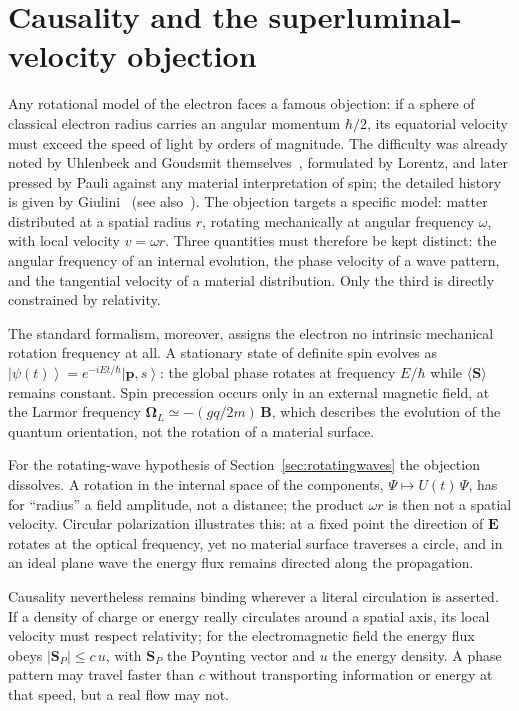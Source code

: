 \documentclass[11pt,a4paper]{article}
\newcommand{\ket}[1]{\left|#1\right\rangle}
\begin{document}
\section{Causality and the superluminal-velocity objection}
\label{sec:causality}

Any rotational model of the electron faces a famous objection: if a sphere of classical electron radius
carries an angular momentum $\hbar/2$, its equatorial velocity must exceed the speed of light by orders of
magnitude.
The difficulty was already noted by Uhlenbeck and Goudsmit themselves~\cite{Uhlenbeck1925}, formulated by
Lorentz, and later pressed by Pauli against any material interpretation of spin; the detailed history is
given by Giulini~\cite{Giulini2008} (see also~\cite{Tomonaga1997}).
The objection targets a specific model: matter distributed at a spatial radius $r$, rotating mechanically at
angular frequency $\omega$, with local velocity $v = \omega r$.
Three quantities must therefore be kept distinct: the angular frequency of an internal evolution, the phase
velocity of a wave pattern, and the tangential velocity of a material distribution.
Only the third is directly constrained by relativity.

The standard formalism, moreover, assigns the electron no intrinsic mechanical rotation frequency at all.
A stationary state of definite spin evolves as $\ket{\psi(t)} = e^{-iEt/\hbar} \ket{\mathbf{p}, s}$: the
global phase rotates at frequency $E/\hbar$ while $\langle \mathbf{S} \rangle$ remains constant.
Spin precession occurs only in an external magnetic field, at the Larmor frequency
$\boldsymbol{\Omega}_L \simeq -(gq/2m)\, \mathbf{B}$, which describes the evolution of the quantum
orientation, not the rotation of a material surface.

For the rotating-wave hypothesis of Section~\ref{sec:rotatingwaves} the objection dissolves.
A rotation in the internal space of the components, $\Psi \mapsto U(t)\, \Psi$, has for ``radius'' a field
amplitude, not a distance; the product $\omega r$ is then not a spatial velocity.
Circular polarization illustrates this: at a fixed point the direction of $\mathbf{E}$ rotates at the
optical frequency, yet no material surface traverses a circle, and in an ideal plane wave the energy flux
remains directed along the propagation.

Causality nevertheless remains binding wherever a literal circulation is asserted.
If a density of charge or energy really circulates around a spatial axis, its local velocity must respect
relativity; for the electromagnetic field the energy flux obeys $|\mathbf{S}_P| \le c\, u$, with
$\mathbf{S}_P$ the Poynting vector and $u$ the energy density.
A phase pattern may travel faster than $c$ without transporting information or energy at that speed, but a
real flow may not.
\end{document}
